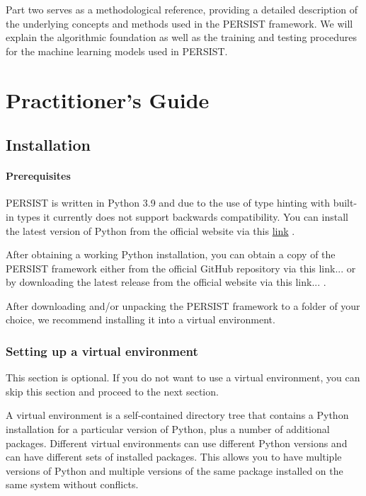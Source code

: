 \documentclass[
	a4paper, %
	12pt, %
]{persist}
\begin{document}
Part two serves as a methodological reference, providing a detailed description of the underlying concepts and methods used in the PERSIST framework. We will explain the algorithmic foundation as well as the training and testing procedures for the machine learning models used in PERSIST.

\section{Practitioner's Guide}

\subsection{Installation}

\paragraph{Prerequisites}

PERSIST is written in Python 3.9 and due to the use of type hinting with built-in types it currently does not support backwards compatibility. You can install the latest version of Python from the official website via this \href{https://www.python.org/downloads/}{link} \ExternalLink.

After obtaining a working Python installation, you can obtain a copy of the PERSIST framework either from the official GitHub repository via this link... \ExternalLink or by downloading the latest release from the official website via this link... \ExternalLink.

After downloading and/or unpacking the PERSIST framework to a folder of your choice, we recommend installing it into a virtual environment.

\subsubsection{Setting up a virtual environment}

\begin{note}
	This section is optional. If you do not want to use a virtual environment, you can skip this section and proceed to the next section.
\end{note}

A virtual environment is a self-contained directory tree that contains a Python installation for a particular version of Python, plus a number of additional packages. Different virtual environments can use different Python versions and can have different sets of installed packages. This allows you to have multiple versions of Python and multiple versions of the same package installed on the same system without conflicts.
\end{document}
